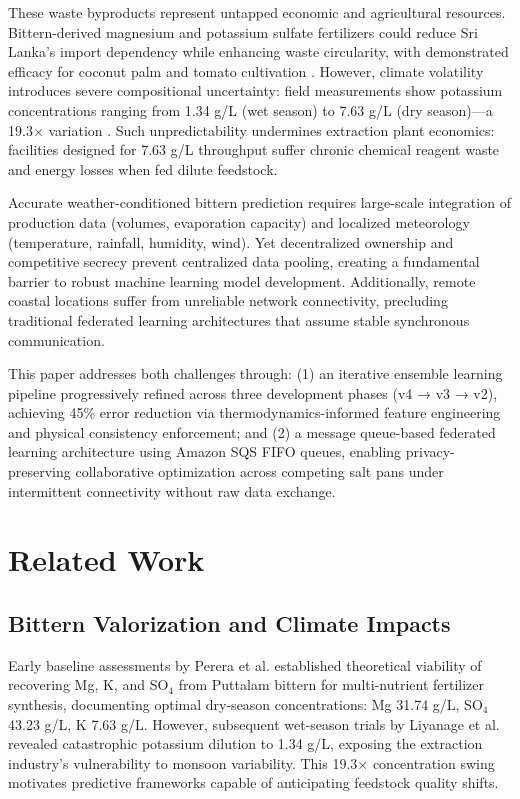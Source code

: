 \documentclass[conference]{IEEEtran}
\begin{document}
These waste byproducts represent untapped economic and agricultural resources. Bittern-derived magnesium and potassium sulfate fertilizers could reduce Sri Lanka's import dependency while enhancing waste circularity, with demonstrated efficacy for coconut palm and tomato cultivation \cite{liyanage2021}. However, climate volatility introduces severe compositional uncertainty: field measurements show potassium concentrations ranging from 1.34 g/L (wet season) to 7.63 g/L (dry season)—a 19.3× variation \cite{liyanage2021}. Such unpredictability undermines extraction plant economics: facilities designed for 7.63 g/L throughput suffer chronic chemical reagent waste and energy losses when fed dilute feedstock.

Accurate weather-conditioned bittern prediction requires large-scale integration of production data (volumes, evaporation capacity) and localized meteorology (temperature, rainfall, humidity, wind). Yet decentralized ownership and competitive secrecy prevent centralized data pooling, creating a fundamental barrier to robust machine learning model development. Additionally, remote coastal locations suffer from unreliable network connectivity, precluding traditional federated learning architectures that assume stable synchronous communication.

This paper addresses both challenges through: (1) an iterative ensemble learning pipeline progressively refined across three development phases (v4 → v3 → v2), achieving 45\% error reduction via thermodynamics-informed feature engineering and physical consistency enforcement; and (2) a message queue-based federated learning architecture using Amazon SQS FIFO queues, enabling privacy-preserving collaborative optimization across competing salt pans under intermittent connectivity without raw data exchange.

\section{Related Work}

\subsection{Bittern Valorization and Climate Impacts}
Early baseline assessments by Perera et al. \cite{perera2019} established theoretical viability of recovering Mg, K, and SO$_4$ from Puttalam bittern for multi-nutrient fertilizer synthesis, documenting optimal dry-season concentrations: Mg 31.74 g/L, SO$_4$ 43.23 g/L, K 7.63 g/L. However, subsequent wet-season trials by Liyanage et al. \cite{liyanage2021} revealed catastrophic potassium dilution to 1.34 g/L, exposing the extraction industry's vulnerability to monsoon variability. This 19.3× concentration swing motivates predictive frameworks capable of anticipating feedstock quality shifts.
\end{document}
